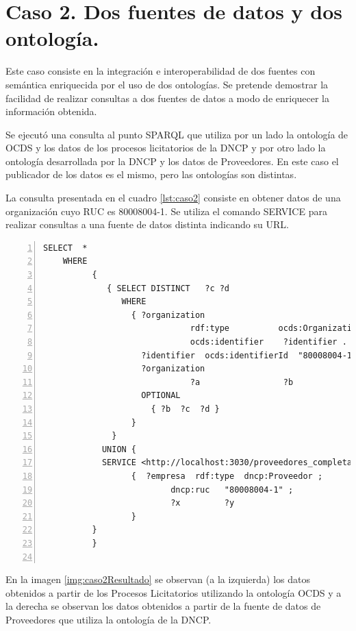\section{Caso 2. Dos fuentes de datos y dos ontología.}


Este caso consiste en la integración e interoperabilidad de dos fuentes con semántica enriquecida por el uso de dos ontologías. Se pretende demostrar la facilidad de realizar consultas a dos fuentes de datos a modo de enriquecer la información obtenida.

Se ejecutó una consulta al punto SPARQL que utiliza por un lado la ontología de OCDS y los datos de los procesos licitatorios de la DNCP y por otro lado la ontología desarrollada por la DNCP y los datos de Proveedores. En este caso el publicador de los datos es el mismo, pero las ontologías son distintas.

La consulta presentada en el cuadro \ref{lst:caso2} consiste en obtener datos de una organización cuyo RUC es 80008004-1. Se utiliza el comando SERVICE para realizar consultas a una fuente de datos distinta indicando su URL.

\noindent\begin{minipage}[t]{\textwidth}
\begin{lstlisting}[captionpos=b, caption={Consulta a dos fuentes de de datos}, label={lst:caso2},  numbers=left,  numberstyle=\tiny\color{mygray},
    basicstyle=\tiny,frame=single]
SELECT  *
    WHERE
          {   
             { SELECT DISTINCT   ?c ?d
                WHERE
                  { ?organization
                              rdf:type          ocds:Organization ;
                              ocds:identifier    ?identifier .
                    ?identifier  ocds:identifierId  "80008004-1" .
                    ?organization
                              ?a                 ?b
                    OPTIONAL
                      { ?b  ?c  ?d }
                  }
              }
            UNION {
            SERVICE <http://localhost:3030/proveedores_completas_no_inf/sparql>
                  {  ?empresa  rdf:type  dncp:Proveedor ;
                          dncp:ruc   "80008004-1" ;
                          ?x         ?y
                  }
          }
          }
    
 \end{lstlisting}
\end{minipage}

 En la imagen \ref{img:caso2Resultado} se observan (a la izquierda) los datos obtenidos a partir de los Procesos Licitatorios utilizando la ontología OCDS y a la derecha se observan los datos obtenidos a partir de la fuente de datos de Proveedores que utiliza la ontología de la DNCP.


